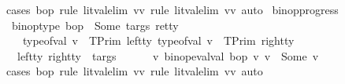 \begin{isabellebody}
\ {\isacharparenleft}{\kern0pt}cases\ bop{\isacharsemicolon}{\kern0pt}\ rule\ lit{\isacharunderscore}{\kern0pt}val{\isacharunderscore}{\kern0pt}elim{\isacharbrackleft}{\kern0pt}\ v{\isacharequal}{\kern0pt}v{}{\isacharbrackright}{\kern0pt}{\isacharsemicolon}{\kern0pt}\ rule\ lit{\isacharunderscore}{\kern0pt}val{\isacharunderscore}{\kern0pt}elim{\isacharbrackleft}{\kern0pt}\ v{\isacharequal}{\kern0pt}v{}{\isacharbrackright}{\kern0pt}{\isacharsemicolon}{\kern0pt}\ auto{\isacharparenright}{\kern0pt}%
\endisatagproof
{\isafoldproof}%
%
\isadelimproof
\isanewline
%
\endisadelimproof
\isanewline
{}\isamarkupfalse%
\ binop{\isacharunderscore}{\kern0pt}progress{\isacharcolon}{\kern0pt}\isanewline
\ {\isachardoublequoteopen}{\isasymlbrakk}\ binop{\isacharunderscore}{\kern0pt}type\ bop\ {\isacharequal}{\kern0pt}\ Some\ {\isacharparenleft}{\kern0pt}targs{\isacharcomma}{\kern0pt}\ ret{\isacharunderscore}{\kern0pt}ty{\isacharparenright}{\kern0pt}{\isacharsemicolon}{\kern0pt}\ \isanewline
\ \ \ \ type{\isacharunderscore}{\kern0pt}of{\isacharunderscore}{\kern0pt}val\ v{}\ {\isacharequal}{\kern0pt}\ TPrim\ left{\isacharunderscore}{\kern0pt}ty{\isacharsemicolon}{\kern0pt}\ type{\isacharunderscore}{\kern0pt}of{\isacharunderscore}{\kern0pt}val\ v{}\ {\isacharequal}{\kern0pt}\ TPrim\ right{\isacharunderscore}{\kern0pt}ty{\isacharsemicolon}{\kern0pt}\isanewline
\ \ \ {\isacharparenleft}{\kern0pt}left{\isacharunderscore}{\kern0pt}ty{\isacharcomma}{\kern0pt}\ right{\isacharunderscore}{\kern0pt}ty{\isacharparenright}{\kern0pt}\ {\isasymin}\ targs\ {\isasymrbrakk}\ {\isasymLongrightarrow}\isanewline
\ \ \ \ {\isasymexists}v{\isachardot}{\kern0pt}\ {\isacharparenleft}{\kern0pt}binop{\isacharunderscore}{\kern0pt}eval{\isacharunderscore}{\kern0pt}val\ bop\ v{}\ v{}{\isacharparenright}{\kern0pt}\ {\isacharequal}{\kern0pt}\ Some\ v\ {\isachardoublequoteclose}\isanewline
%
\isadelimproof
\ \ %
\endisadelimproof
%
\isatagproof
{}\isamarkupfalse%
\ {\isacharparenleft}{\kern0pt}cases\ bop{\isacharsemicolon}{\kern0pt}\ rule\ lit{\isacharunderscore}{\kern0pt}val{\isacharunderscore}{\kern0pt}elim{\isacharbrackleft}{\kern0pt}\ v{\isacharequal}{\kern0pt}v{}{\isacharbrackright}{\kern0pt}{\isacharsemicolon}{\kern0pt}\ rule\ lit{\isacharunderscore}{\kern0pt}val{\isacharunderscore}{\kern0pt}elim{\isacharbrackleft}{\kern0pt}\ v{\isacharequal}{\kern0pt}v{}{\isacharbrackright}{\kern0pt}{\isacharsemicolon}{\kern0pt}\ auto{\isacharparenright}{\kern0pt}%

\end{isabellebody}
